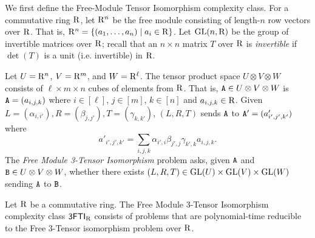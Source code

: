 We first define the Free-Module Tensor Isomorphism complexity class. For a commutative ring $\mathrm{R}$, let $\mathrm{R}^n$ be the free module consisting of length-$n$ row vectors over $\mathrm{R}$. That is, $\mathrm{R}^n=\{(a_1, \dots, a_n)\mid a_i\in \mathrm{R}\}$. Let $\mathrm{GL}(n, \mathrm{R})$ be the group of invertible matrices over $\mathrm{R}$; recall that an $n\times n$ matrix $T$ over $\mathrm{R}$ is \emph{invertible} if $\det(T)$ is a unit (i.e. invertible) in $\mathrm{R}$. 

Let $U=\mathrm{R}^n$, $V=\mathrm{R}^m$, and $W=\mathrm{R}^\ell$. The tensor product space $U\otimes V\otimes W$ consists of $\ell\times m\times n$ cubes of elements from $\mathrm{R}$. That is, $\mathtt{A}\in U\otimes V\otimes W$ is $\mathtt{A}=(a_{i,j,k})$ where $i\in[\ell]$, $j\in[m]$, $k\in[n]$ and $a_{i,j,k}\in \mathrm{R}$. Given $L=(\alpha_{i,i'}), R=(\beta_{j,j'}), T=(\gamma_{k,k'})$, $(L, R, T)$ sends $\mathtt{A}$ to $\mathtt{A}'=(a'_{i',j',k'})$ where 
\begin{equation}\label{eq:action}
	a'_{i',j',k'}=\sum_{i,j,k}\alpha_{i',i}\beta_{j',j}\gamma_{k',k}a_{i,j,k}.
\end{equation}
The \emph{Free Module 3-Tensor Isomorphism} problem asks, given $\mathtt{A}$ and $\mathtt{B}\in U\otimes V\otimes W$, whether there exists $(L, R, T)\in \mathrm{GL}(U)\times\mathrm{GL}(V)\times\mathrm{GL}(W)$ sending $\mathtt{A}$ to $\mathtt{B}$.


\begin{definition}\label{def:freeTI}
	Let $\mathrm{R}$ be a commutative ring. The Free Module 3-Tensor Isomorphism complexity class ${\sf 3FTI}_{\mathrm{R}}$ consists of problems that are polynomial-time reducible to the Free 3-Tensor isomorphism problem over $\mathrm{R}$.
\end{definition}

